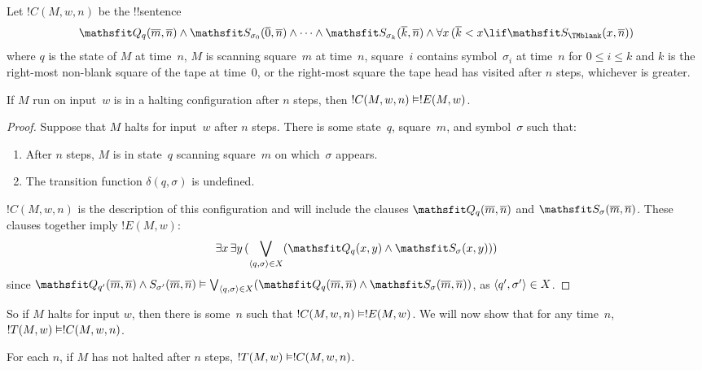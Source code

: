 \documentclass[../../../include/open-logic-section]{subfiles}
\begin{document}
\begin{defn} 
Let $!C(M, w, n)$ be the !!{sentence}
\[ 
\Obj Q_q(\num{m}, \num{n}) \land \Obj S_{\sigma_0}(\num{0}, \num{n})
\land \dots \land \Obj S_{\sigma_k}(\num{k}, \num{n}) \land
\lforall[x][(\num{k} < x \lif \Obj S_\TMblank(x, \num{n}))]
\] 
where $q$ is the state of $M$ at time~$n$, $M$ is scanning square~$m$
at time~$n$, square~$i$ contains symbol~$\sigma_i$ at time~$n$ for $0
\le i \le k$ and $k$ is the right-most non-blank square of the tape at
time~$0$, or the right-most square the tape head has visited after $n$
steps, whichever is greater.
\end{defn}

\begin{lem}
If $M$ run on input~$w$ is in a halting configuration after $n$ steps,
then $!C(M, w, n) \Entails !E(M, w)$.
\end{lem}

\begin{proof}
Suppose that $M$ halts for input~$w$ after $n$ steps.
There is some state~$q$, square~$m$, and symbol~$\sigma$ such that:
\begin{enumerate} 
\item After $n$ steps, $M$ is in state~$q$ scanning square~$m$ on
  which~$\sigma$ appears.
\item The transition function $\delta(q, \sigma)$ is undefined.
\end{enumerate}
$!C(M, w, n)$ is the description of this configuration and will
include the clauses $\Obj Q_{q}(\num{m}, \num{n})$ and $\Obj
S_{\sigma}(\num{m}, \num{n})$. These clauses together imply $!E(M,
w)$:
\[
\lexists[x][\lexists[y][(\bigvee_{\tuple{q, \sigma} \in
      X}(\Obj Q_q(x, y) \land \Obj S_\sigma(x, y)))]]
\]
since $\Obj Q_{q'}(\num{m}, \num{n}) \land S_{\sigma'}(\num{m},
\num{n}) \Entails \bigvee_{\tuple{q, \sigma} \in X} (\Obj Q_q(\num{m},
\num{n}) \land \Obj S_{\sigma}(\num{m}, \num{n}))$, as
$\langle q',\sigma' \rangle \in X$. 
\end{proof}

\begin{explain}
So if $M$ halts for input $w$, then there is some~$n$ such that $!C(M,
w, n) \Entails !E(M,w)$.  We will now show that for any time~$n$,
$!T(M, w) \Entails !C(M, w, n)$.
\end{explain}

\begin{lem}
For each $n$, if $M$ has not halted after $n$ steps, $!T(M, w)
\Entails !C(M, w, n)$.
\end{lem}
\end{document}
